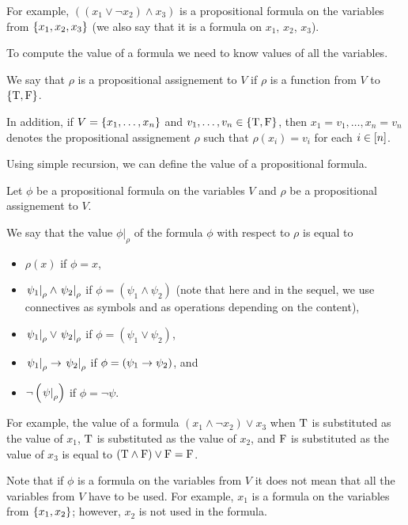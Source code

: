 For example, $((x_1 \lor \lnot x_2) \land x_3)$ is a propositional formula on
the variables from $\set{x_1, x_2, x_3}$ (we also say that it is a formula on
$x_1$, $x_2$, $x_3$).

To compute the value of a formula we need to know values of all the variables.
\begin{definition}
  We say that $\rho$ is a propositional assignement to $V$ if $\rho$
  is a function from $V$ to $\set{\ltrue, \lfalse}$.

  In addition, if $V = \set{x_1, \dots, x_n}$ and
  $v_1, \dots, v_n \in \set{\ltrue, \lfalse}$, then
  $x_1 = v_1, \dots, x_n = v_n$ denotes the propositional assignement
  $\rho$ such that $\rho(x_i) = v_i$ for each $i \in [{n}]$.
\end{definition}

Using simple recursion, we can define the value of a propositional formula.
\begin{definition}
  Let $\phi$ be a propositional formula on the variables $V$ and
  $\rho$ be a propositional assignement to $V$.

  We say that the value $\phi\big\rvert_\rho$ of the
  formula $\phi$ with respect to $\rho$ is equal to
  \begin{itemize}
    \item $\rho(x)$ if $\phi = x$,
    \item $\left. {\psi_1} \right\rvert_{\rho} \land
      \left. {\psi_2} \right\rvert_{\rho}$ if
      $\phi = (\psi_1 \land \psi_2)$ (note that here and in the
      sequel, we use connectives as symbols and as operations depending on
      the content),
    \item $\left. {\psi_1} \right\rvert_{\rho} \lor
      \left. {\psi_2} \right\rvert_{\rho}$ if
      $\phi = (\psi_1 \lor \psi_2)$,
    \item $\left. {\psi_1} \right\rvert_{\rho} \rightarrow
      \left. {\psi_2} \right\rvert_{\rho}$ if
      $\phi = (\psi_1 \rightarrow \psi_2)$, and
    \item $\lnot\left(\left. {\psi} \right\rvert_{\rho}\right)$
      if $\phi = \lnot \psi$.
  \end{itemize}
\end{definition}

For example, the value of a formula $(x_1 \land \lnot x_2) \lor x_3$ when
$\text{T}$ is substituted as the value of $x_1$,
$\text{T}$ is substituted as the value of $x_2$,
and $\text{F}$ is substituted as the value of $x_3$ is equal to
$(\text{T} \land \text{F}) \lor \text{F} = \text{F}$.

Note that if $\phi$ is a formula on the variables from $V$ it does not mean that
all the variables from $V$ have to be used.
For example, $x_1$ is a formula on the variables from $\set{x_1, x_2}$; however,
$x_2$ is not used in the formula.


